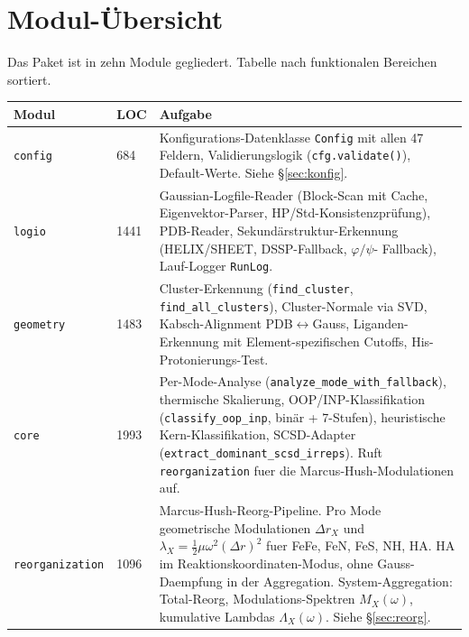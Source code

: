 \documentclass[11pt,a4paper,twoside]{article}
\theoremstyle{remark}
\begin{document}
\section{Modul-\"Ubersicht}
\label{sec:moduluebersicht}

Das Paket ist in zehn Module gegliedert. Tabelle nach
funktionalen Bereichen sortiert.

\begin{longtable}{p{} p{} p{}}
\toprule
\textbf{Modul} & \textbf{LOC} & \textbf{Aufgabe} \\
\midrule
\endhead

\texttt{config} & 684 & Konfigurations-Datenklasse \texttt{Config}
  mit allen 47 Feldern, Validierungslogik (\texttt{cfg.validate()}),
  Default-Werte. Siehe \S\ref{sec:konfig}. \\

\texttt{logio} & 1441 & Gaussian-Logfile-Reader (Block-Scan mit Cache,
  Eigenvektor-Parser, HP/Std-Konsistenzpr\"ufung), PDB-Reader,
  Sekund\"arstruktur-Erkennung (HELIX/SHEET, DSSP-Fallback, $\varphi/\psi$-
  Fallback), Lauf-Logger \texttt{RunLog}. \\

\texttt{geometry} & 1483 & Cluster-Erkennung
  (\texttt{find\_cluster}, \texttt{find\_all\_clusters}),
  Cluster-Normale via SVD, Kabsch-Alignment PDB$\leftrightarrow$Gauss,
  Liganden-Erkennung mit Element-spezifischen Cutoffs,
  His-Protonierungs-Test. \\

\texttt{core} & 1993 & Per-Mode-Analyse (\texttt{analyze\_mode\_with\_fallback}),
  thermische Skalierung, OOP/INP-Klassifikation
  (\texttt{classify\_oop\_inp}, bin\"ar + 7-Stufen),
  heuristische Kern-Klassifikation, SCSD-Adapter
  (\texttt{extract\_dominant\_scsd\_irreps}). Ruft
  \texttt{reorganization} fuer die Marcus-Hush-Modulationen auf. \\

\texttt{reorganization} & 1096 & Marcus-Hush-Reorg-Pipeline.
  Pro Mode geometrische Modulationen $\Delta r_X$ und
  $\lambda_X = \tfrac{1}{2}\mu\omega^2(\Delta r)^2$ fuer FeFe, FeN,
  FeS, NH, HA. HA im Reaktionskoordinaten-Modus, ohne
  Gauss-Daempfung in der Aggregation.
  System-Aggregation: Total-Reorg, Modulations-Spektren $M_X(\omega)$,
  kumulative Lambdas $\Lambda_X(\omega)$. Siehe \S\ref{sec:reorg}. \\


\end{longtable}
\end{document}
